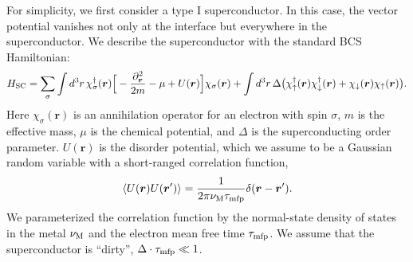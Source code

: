 \documentclass[pra,aps,a4paper,twocolumn,superscriptaddress,longbibliography]{revtex4-2}
\begin{document}
For simplicity, we first consider a type I superconductor. In this case, the vector potential vanishes not only at the interface but everywhere in the superconductor. We describe the superconductor with the standard BCS Hamiltonian:
\begin{equation}\label{eq:H_SC}
    H_{\rm SC} = \sum_\sigma\int d^3r\,\chi^\dagger_\sigma({\bm r})\Big[-\frac{\partial_{\bm r}^2}{2m} - \mu + U({\bm r})\Big] \chi_\sigma({\bm r}) + \int d^3 r\,\Delta \big(\chi_\uparrow^\dagger ({\bm r})\chi_\downarrow^\dagger({\bm r}) + \chi_\downarrow ({\bm r})\chi_\uparrow ({\bm r})\big).
\end{equation}
Here $\chi_\sigma(\bm r)$ is an annihilation operator for an electron with spin $\sigma$, $m$ is the effective mass, $\mu$ is the chemical potential, and $\Delta$ is the superconducting order parameter. 
$U({\bm r})$ is the disorder potential, which we assume to be a Gaussian random variable with a short-ranged correlation function,
\begin{equation}\label{eq:disorder}
    \langle U({\bm r}) U({\bm r}^\prime)\rangle = \frac{1}{2\pi \nu_{\rm M} \tau_{\rm mfp}} \delta({\bm r} - {\bm r}^\prime).
\end{equation}
We parameterized the correlation function by the normal-state density of states in the metal $\nu_{\rm M}$ and the electron mean free time $\tau_{\rm mfp}$. We assume that the superconductor is ``dirty'',  $\Delta\cdot \tau_{\rm mfp} \ll 1$. 
\end{document}
